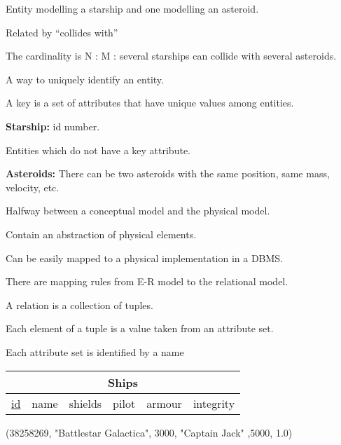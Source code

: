 \documentclass{beamer}
\begin{document}
\begin{slide}{
\item Entity modelling a starship and one modelling an asteroid.
\item Related by ``collides with''
\item The cardinality is N : M : several starships can collide with several asteroids.

}\end{slide}

\begin{slide}{
\item A way to uniquely identify an entity.
\item A key is a set of attributes that have unique values among entities.
\item \textbf{Starship:} id number.

}\end{slide}

\begin{slide}{
\item Entities which do not have a key attribute.
\item \textbf{Asteroids:} There can be two asteroids with the same position, same mass, velocity, etc.

}\end{slide}

\begin{slide}{
\item Halfway between a conceptual model and the physical model.
\item Contain an abstraction of physical elements.
\item Can be easily mapped to a physical implementation in a DBMS.
\item There are mapping rules from E-R model to the relational model.
}\end{slide}

\begin{slide}{
\item A relation is a collection of tuples.
\item Each element of a tuple is a value taken from an attribute set.
\item Each attribute set is identified by a name

\vspace{0.5cm}
\centering
\begin{tabular}{|c|c|c|c|c||c|}
\hline
\multicolumn{6}{|c|}{\textbf{Ships}} \\
\hline
\underline{id} & name & shields & pilot & armour & integrity \\
\hline
\end{tabular}

\vspace{0.5cm}
(38258269, "Battlestar Galactica", 3000, "Captain Jack" ,5000, 1.0)
}\end{slide}
\end{document}
